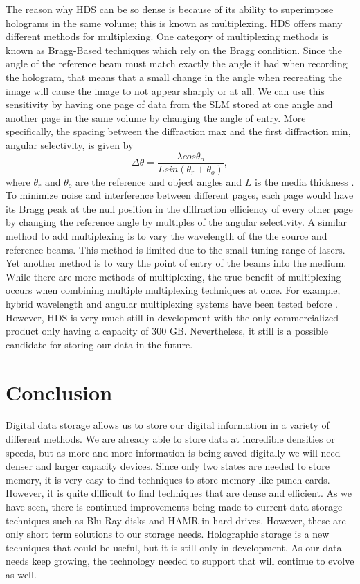 \documentclass[ notitlepage, numerical, 11pt]{revtex4-1} %
\begin{document}
The reason why HDS can be so dense is because of its ability to superimpose holograms in the same volume; this is known as multiplexing. HDS offers many different methods for multiplexing. One category of multiplexing methods is known as Bragg-Based techniques which rely on the Bragg condition. Since the angle of the reference beam must match exactly the angle it had when recording the hologram, that means that a small change in the angle when recreating the image will cause the image to not appear sharply or at all. We can use this sensitivity by having one page of data from the SLM stored at one angle and another page in the same volume by changing the angle of entry. More specifically, the spacing between the diffraction max and the first diffraction min, angular selectivity, is given by
\begin{equation}
\Delta \theta = \frac{\lambda cos\theta_o}{Lsin(\theta_r + \theta_o)},
\label{angular}
\end{equation}
where $\theta_r$ and $\theta_o$ are the reference and object angles and $L$ is the media thickness \cite{HDS}. To minimize noise and interference between different pages, each page would have its Bragg peak at the null position in the diffraction efficiency of every other page by changing the reference angle by multiples of the angular selectivity. A similar method to add multiplexing is to vary the wavelength of the the source and reference beams. This method is limited due to the small tuning range of lasers. Yet another method is to vary the point of entry of the beams into the medium. While there are more methods of multiplexing, the true benefit of multiplexing occurs when combining multiple multiplexing techniques at once. For example, hybrid wavelength and angular multiplexing systems have been tested before \cite{memory}. However, HDS is very much still in development with the only commercialized product only having a capacity of 300 GB. Nevertheless, it still is a possible candidate for storing our data in the future.

\section{Conclusion}
Digital data storage allows us to store our digital information in a variety of different methods. We are already able to store data at incredible densities or speeds, but as more and more information is being saved digitally we will need denser and larger capacity devices. Since only two states are needed to store memory, it is very easy to find techniques to store memory like punch cards. However, it is quite difficult to find techniques that are dense and efficient. As we have seen, there is continued improvements being made to current data storage techniques such as Blu-Ray disks and HAMR in hard drives. However, these are only short term solutions to our storage needs. Holographic storage is a new techniques that could be useful, but it is still only in development. As our data needs keep growing, the technology needed to support that will continue to evolve as well.
\end{document}
